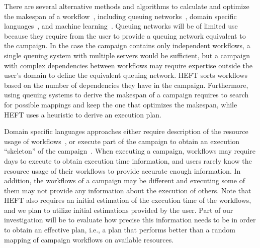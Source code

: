 There are several alternative methods and algorithms to calculate and optimize the makespan of a workflow~\cite{lu2019review}, including queuing networks~\cite{yao2019throughput,bao2019performance}, domain specific languages~\cite{carothers2017durango,maheshwari2016workflow}, and machine learning~\cite{witt2019predictive,pumma2017runtime}.
Queuing networks will be of limited use because they require from the user to provide a queuing network equivalent to the campaign.
In the case the campaign contains only independent workflows, a single queuing system with multiple servers would be sufficient, but a campaign with complex dependencies between workflows may require expertise outside the user's domain to define the equivalent queuing network.
HEFT sorts workflows based on the number of dependencies they have in the campaign.
Furthermore, using queuing systems to derive the makespan of a campaign requires to search for possible mappings and keep the one that optimizes the makespan, while HEFT uses a heuristic to derive an execution plan.

Domain specific languages approaches either require description of the resource usage of workflows~\cite{carothers2017durango}, or execute part of the campaign to obtain an execution ``skeleton'' of the campaign~\cite{maheshwari2016workflow}.
When executing a campaign, workflows may require days to execute to obtain execution time information, and users rarely know the resource usage of their workflows to provide accurate enough information.
In addition, the workflows of a campaign may be different and executing some of them may not provide any information about the execution of others.
Note that HEFT also requires an initial estimation of the execution time of the workflows, and we plan to utilize initial estimations provided by the user. 
Part of our investigation will be to evaluate how precise this information needs to be in order to obtain an effective plan, i.e., a plan that performs better than a random mapping of campaign workflows on available resources.


